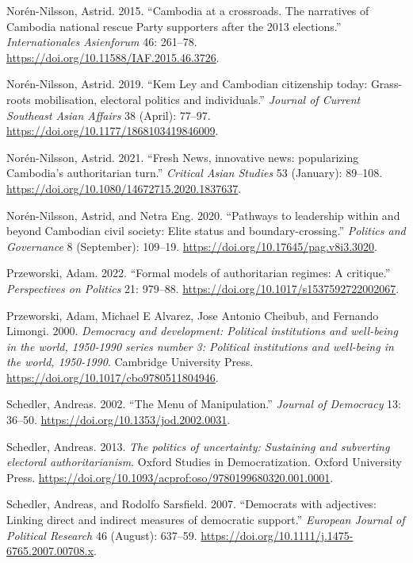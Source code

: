\documentclass[Review,times,sageh,doublespace]{sagej}
\newlength{\cslhangindent}
\newenvironment{CSLReferences}[2] %
 {\begin{list}{}{%
  \setlength{\itemindent}{0pt}
  \setlength{\leftmargin}{0pt}
  \setlength{\parsep}{0pt}
  \ifodd #1
   \setlength{\leftmargin}{\cslhangindent}
   \setlength{\itemindent}{-1\cslhangindent}
  \fi
  \setlength{\itemsep}{#2\baselineskip}}}
 {\end{list}}
\begin{document}
\begin{CSLReferences}{1}{1}
Norén-Nilsson, Astrid. 2015. {``{Cambodia at a crossroads. The
narratives of Cambodia national rescue Party supporters after the 2013
elections}.''} \emph{Internationales Asienforum} 46: 261--78.
\url{https://doi.org/10.11588/IAF.2015.46.3726}.

Norén-Nilsson, Astrid. 2019. {``{Kem Ley and Cambodian citizenship
today: Grass-roots mobilisation, electoral politics and individuals}.''}
\emph{Journal of Current Southeast Asian Affairs} 38 (April): 77--97.
\url{https://doi.org/10.1177/1868103419846009}.

Norén-Nilsson, Astrid. 2021. {``{Fresh News, innovative news:
popularizing Cambodia's authoritarian turn}.''} \emph{Critical Asian
Studies} 53 (January): 89--108.
\url{https://doi.org/10.1080/14672715.2020.1837637}.

Norén-Nilsson, Astrid, and Netra Eng. 2020. {``{Pathways to leadership
within and beyond Cambodian civil society: Elite status and
boundary-crossing}.''} \emph{Politics and Governance} 8 (September):
109--19. \url{https://doi.org/10.17645/pag.v8i3.3020}.

Przeworski, Adam. 2022. {``{Formal models of authoritarian regimes: A
critique}.''} \emph{Perspectives on Politics} 21: 979--88.
\url{https://doi.org/10.1017/s1537592722002067}.

Przeworski, Adam, Michael E Alvarez, Jose Antonio Cheibub, and Fernando
Limongi. 2000. \emph{{Democracy and development: Political institutions
and well-being in the world, 1950-1990 series number 3: Political
institutions and well-being in the world, 1950-{1990}}}. Cambridge
University Press. \url{https://doi.org/10.1017/cbo9780511804946}.

Schedler, Andreas. 2002. {``{The Menu of Manipulation}.''} \emph{Journal
of Democracy} 13: 36--50. \url{https://doi.org/10.1353/jod.2002.0031}.

Schedler, Andreas. 2013. \emph{{The politics of uncertainty: Sustaining
and subverting electoral authoritarianism}}. Oxford Studies in
Democratization. Oxford University Press.
\url{https://doi.org/10.1093/acprof:oso/9780199680320.001.0001}.

Schedler, Andreas, and Rodolfo Sarsfield. 2007. {``{Democrats with
adjectives: Linking direct and indirect measures of democratic
support}.''} \emph{European Journal of Political Research} 46 (August):
637--59. \url{https://doi.org/10.1111/j.1475-6765.2007.00708.x}.


\end{CSLReferences}
\end{document}

